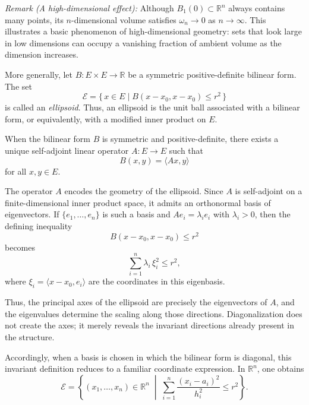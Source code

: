 \medskip

\textit{Remark (A high-dimensional effect):}
Although $B_1(0)\subset \mathbb{R}^n$ always contains many points, its
$n$-dimensional volume satisfies $\omega_n\to 0$ as $n\to\infty$.
This illustrates a basic phenomenon of high-dimensional geometry: sets that
look large in low dimensions can occupy a vanishing fraction of ambient volume
as the dimension increases.

\medskip

More generally, let $B:E\times E\to \mathbb{R}$ be a symmetric
positive-definite bilinear form. The set
\[
\mathcal{E}=\{\,x\in E \mid B(x-x_0,x-x_0)\le r^2\,\}
\]
is called an \emph{ellipsoid}.
Thus, an ellipsoid is the unit ball associated with a bilinear form, or
equivalently, with a modified inner product on $E$.

\medskip

When the bilinear form $B$ is symmetric and positive-definite, there exists a
unique self-adjoint linear operator $A:E\to E$ such that
\[
B(x,y)=\langle Ax,y\rangle
\]
for all $x,y\in E$.

\medskip

The operator $A$ encodes the geometry of the ellipsoid.
Since $A$ is self-adjoint on a finite-dimensional inner product space, it
admits an orthonormal basis of eigenvectors.
If $\{e_1,\dots,e_n\}$ is such a basis and $A e_i=\lambda_i e_i$ with
$\lambda_i>0$, then the defining inequality
\[
B(x-x_0,x-x_0)\le r^2
\]
becomes
\[
\sum_{i=1}^n \lambda_i\, \xi_i^2 \le r^2,
\]
where $\xi_i=\langle x-x_0,e_i\rangle$ are the coordinates in this
eigenbasis.


\medskip

Thus, the principal axes of the ellipsoid are precisely the eigenvectors of
$A$, and the eigenvalues determine the scaling along those directions.
Diagonalization does not create the axes; it merely reveals the invariant
directions already present in the structure.

\medskip

Accordingly, when a basis is chosen in which the bilinear form is diagonal,
this invariant definition reduces to a familiar coordinate expression.
In $\mathbb{R}^n$, one obtains
\[
\mathcal{E}
=
\left\{
(x_1,\dots,x_n)\in\mathbb{R}^n
\;\middle|\;
\sum_{i=1}^n \frac{(x_i-a_i)^2}{h_i^2} \le r^2
\right\}.
\]

